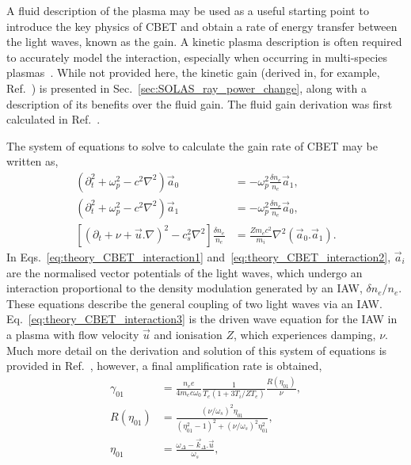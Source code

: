 A fluid description of the plasma may be used as a useful starting point to introduce the key physics of \ac{CBET} and obtain a rate of energy transfer between the light waves, known as the gain.
A kinetic plasma description is often required to accurately model the interaction, especially when occurring in multi-species plasmas~\cite{williams_frequency_1995}.
While not provided here, the kinetic gain (derived in, for example, Ref.~\cite{michel_saturation_2013}) is presented in Sec.~\ref{sec:SOLAS_ray_power_change}, along with a description of its benefits over the fluid gain.
The fluid gain derivation was first calculated in Ref.~\cite{randall_theory_1981}. 

The system of equations to solve to calculate the gain rate of \ac{CBET} may be written as,
\begin{align}
    \label{eq:theory_CBET_interaction1}
    (\partial_t^2 + \omega_p^2 - c^2\nabla^2)\vec{a}_0 &= -\omega_p^2\frac{\delta n_e}{n_{e}}\vec{a}_1,\\
    \label{eq:theory_CBET_interaction2}
    (\partial_t^2 + \omega_p^2 - c^2\nabla^2)\vec{a}_1 &= -\omega_p^2\frac{\delta n_e}{n_{e}}\vec{a}_0,\\
    \label{eq:theory_CBET_interaction3}
    \left[ \left( \partial_t + \nu + \vec{u}.\nabla \right)^2 - c_s^2\nabla^2 \right]\frac{\delta n_e}{n_{e}} &= \frac{Z m_e c^2}{m_i}\nabla^2 (\vec{a}_0 . \vec{a}_1).
\end{align}
In Eqs.~\ref{eq:theory_CBET_interaction1} and~\ref{eq:theory_CBET_interaction2}, $\vec{a}_i$ are the normalised vector potentials of the light waves, which undergo an interaction proportional to the density modulation generated by an \ac{IAW}, $\delta n_e/n_{e}$.
These equations describe the general coupling of two light waves via an \ac{IAW}.
Eq.~\ref{eq:theory_CBET_interaction3} is the driven wave equation for the \ac{IAW} in a plasma with flow velocity $\vec{u}$ and ionisation $Z$, which experiences damping, $\nu$.
Much more detail on the derivation and solution of this system of equations is provided in Ref.~\cite{michel_introduction_2023}, however, a final amplification rate is obtained,
\begin{align}
    \label{eq:theory_CBET_linear_gain}
    \gamma_{01} &= \frac{n_e e}{4 m_e c \omega_0} \frac{1}{T_e \left( 1 + 3 T_i / Z T_e \right)} \frac{R(\eta_{01})}{\nu}, \\
    R(\eta_{01}) &= \frac{ (\nu/\omega_{s})^2 \eta_{01} } { (\eta_{01}^2 - 1)^2 + (\nu/\omega_s)^2 \eta_{01}^2 }, \\
    \label{eq:theory_resonace_param_fluid}
    \eta_{01} &= \frac{ \omega_\Delta - \vec{k}_\Delta.\vec{u} }{\omega_s},
\end{align}
